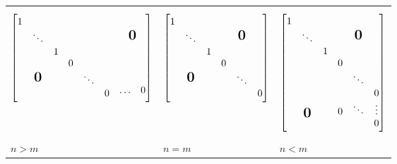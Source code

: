 \documentclass[11pt]{article}
\begin{document}
 \begin{tabular}{p{4.8cm} p{3.4cm} p{3cm}}
\begin{equation*}
  \begin{bmatrix}
    \begin{matrix}
      1 &&\\&\ddots&\\&&1\\
    \end{matrix}&&\mbox{\normalfont\Large\bfseries 0}\\
    \mbox{\normalfont\Large\bfseries 0}&
    \begin{matrix}
      0&&\\&\ddots&\\&&0\\
    \end{matrix}&
    \begin{matrix}&\\&\\\dots&0
    \end{matrix}
  \end{bmatrix}
\end{equation*}&
\begin{equation*}
  \begin{bmatrix}
    \begin{matrix}
      1 &&\\&\ddots&\\&&1\\
    \end{matrix}&\mbox{\normalfont\Large\bfseries 0}\\
    \mbox{\normalfont\Large\bfseries 0}&
    \begin{matrix}
      0&&\\&\ddots&\\&&0\\
    \end{matrix}
  \end{bmatrix}
\end{equation*}&
\begin{equation*}
  \begin{bmatrix}
    \begin{matrix}
      1 &&\\&\ddots&\\&&1\\
    \end{matrix}&\mbox{\normalfont\Large\bfseries 0}\\&
    \begin{matrix}
      0&&\\
      &\ddots&\\
      &&0\\
    \end{matrix}\\\mbox{\normalfont\Large\bfseries 0}&
    \begin{matrix}
      0&\ddots &\vdots\\& &0
    \end{matrix}
  \end{bmatrix}
\end{equation*}\\
  $n>m$&$n=m$&$n<m$
 \end{tabular}
\end{document}
